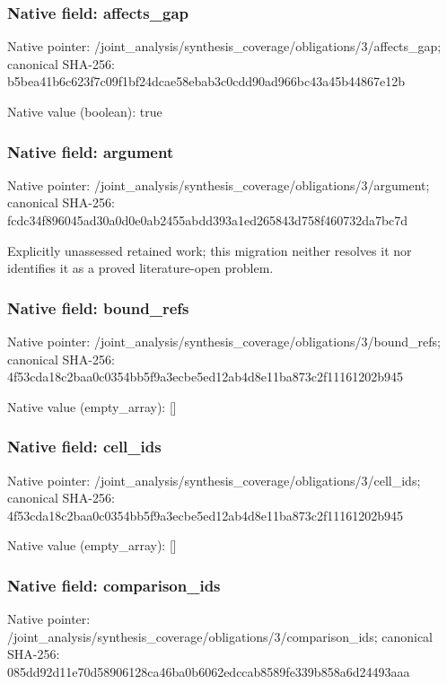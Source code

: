 \documentclass[10pt,a4paper]{article}
\begin{document}
\subsubsection{Native field: affects\_\allowbreak{}gap}
Native pointer: /joint\_\allowbreak{}analysis/synthesis\_\allowbreak{}coverage/obligations/3/affects\_\allowbreak{}gap; canonical SHA-256: b5bea41b6c623f7c09f1bf24dcae58ebab3c0cdd90ad966bc43a45b44867e12b

Native value (boolean): true

\subsubsection{Native field: argument}
Native pointer: /joint\_\allowbreak{}analysis/synthesis\_\allowbreak{}coverage/obligations/3/argument; canonical SHA-256: fcdc34f896045ad30a0d0e0ab2455abdd393a1ed265843d758f460732da7bc7d

\begingroup\raggedright\sloppy Explicitly unassessed retained work;\allowbreak{} this migration neither resolves it nor identifies it as a proved literature-open problem.\par\endgroup

\subsubsection{Native field: bound\_\allowbreak{}refs}
Native pointer: /joint\_\allowbreak{}analysis/synthesis\_\allowbreak{}coverage/obligations/3/bound\_\allowbreak{}refs; canonical SHA-256: 4f53cda18c2baa0c0354bb5f9a3ecbe5ed12ab4d8e11ba873c2f11161202b945

Native value (empty\_\allowbreak{}array): []

\subsubsection{Native field: cell\_\allowbreak{}ids}
Native pointer: /joint\_\allowbreak{}analysis/synthesis\_\allowbreak{}coverage/obligations/3/cell\_\allowbreak{}ids; canonical SHA-256: 4f53cda18c2baa0c0354bb5f9a3ecbe5ed12ab4d8e11ba873c2f11161202b945

Native value (empty\_\allowbreak{}array): []

\subsubsection{Native field: comparison\_\allowbreak{}ids}
Native pointer: /joint\_\allowbreak{}analysis/synthesis\_\allowbreak{}coverage/obligations/3/comparison\_\allowbreak{}ids; canonical SHA-256: 085dd92d11e70d58906128ca46ba0b6062edccab8589fe339b858a6d24493aaa
\end{document}
